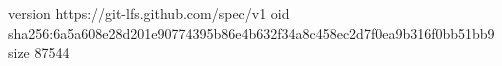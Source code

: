 version https://git-lfs.github.com/spec/v1
oid sha256:6a5a608e28d201e90774395b86e4b632f34a8c458ec2d7f0ea9b316f0bb51bb9
size 87544
